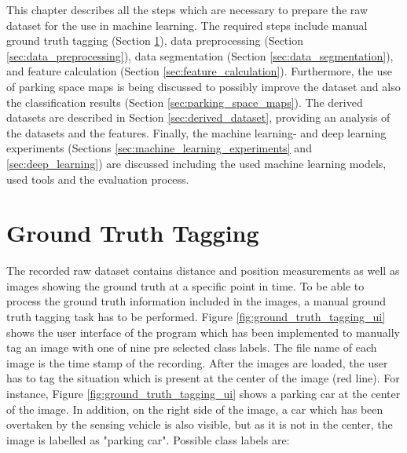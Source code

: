 This chapter describes all the steps which are necessary to prepare the raw dataset for the use in machine learning. The required steps include manual ground truth tagging (Section \ref{sec:ground_truth_tagging}), data preprocessing (Section \ref{sec:data_preprocessing}), data segmentation (Section \ref{sec:data_segmentation}), and feature calculation (Section \ref{sec:feature_calculation}).
Furthermore, the use of parking space maps is being discussed to possibly improve the dataset and also the classification results (Section \ref{sec:parking_space_maps}). The derived datasets are described in Section \ref{sec:derived_dataset}, providing an analysis of the datasets and the features. Finally, the machine learning- and deep learning experiments (Sections \ref{sec:machine_learning_experiments} and \ref{sec:deep_learning}) are discussed including the used machine learning models, used tools and the evaluation process.





\section{Ground Truth Tagging}
\label{sec:ground_truth_tagging}

The recorded raw dataset contains distance and position measurements as well as images showing the ground truth at a specific point in time. To be able to process the ground truth information included in the images, a manual ground truth tagging task has to be performed. Figure \ref{fig:ground_truth_tagging_ui} shows the user interface of the program which has been implemented to manually tag an image with one of nine pre selected class labels. The file name of each image is the time stamp of the recording. After the images are loaded, the user has to tag the situation which is present at the center of the image (red line). For instance, Figure \ref{fig:ground_truth_tagging_ui} shows a parking car at the center of the image. In addition, on the right side of the image, a car which has been overtaken by the sensing vehicle is also visible, but as it is not in the center, the image is labelled as "parking car".
Possible class labels are: 

